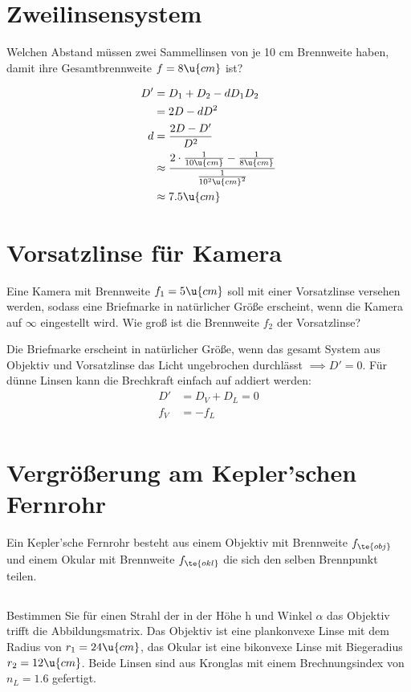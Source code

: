 \documentclass[ex]{exercise}
\begin{document}
\section{Zweilinsensystem}
Welchen Abstand müssen zwei Sammellinsen von je 10 cm Brennweite haben, damit ihre 
Gesamtbrennweite \(f=8 \u{cm}\) ist?

\dottedline

\begin{align*}
    D' &= D_1 + D_2 - d D_1 D_2\\
    &= 2 D - d D^2\\
    d &=\frac{2D - D'}{D^2}\\
    &\approx \frac{2\cdot \frac 1{10\u{cm}} - \frac1{8\u{cm}}}{\frac1{10^2\u{cm}^2}}\\
    &\approx 7.5\u{cm}
\end{align*}

\section{Vorsatzlinse für Kamera}
Eine Kamera mit Brennweite $f_1 = 5 \u{cm}$ soll mit einer Vorsatzlinse versehen werden, sodass eine 
Briefmarke in natürlicher Größe erscheint, wenn die Kamera auf \(\infty\) eingestellt wird.
Wie groß ist die Brennweite $f_2$ der Vorsatzlinse?

\dottedline\vspace{-0.2cm}

Die Briefmarke erscheint in natürlicher Größe, wenn das gesamt System aus Objektiv und Vorsatzlinse
das Licht ungebrochen durchlässt \(\implies D' = 0\).
Für dünne Linsen kann die Brechkraft einfach auf addiert werden:
\begin{align*}
    D' &= D_V + D_L=0\\
    f_V &= - f_L\\
\end{align*}

\section{Vergrö{\ss}erung am Kepler'schen Fernrohr}
Ein Kepler’sche Fernrohr besteht aus einem Objektiv mit Brennweite $f_{\te{obj}}$ 
und einem Okular mit Brennweite $f_{\te{okl}}$ die sich den selben Brennpunkt teilen.

\subsection{}
Bestimmen Sie für einen Strahl der in der Höhe h und Winkel \(\alpha\) das Objektiv trifft die 
Abbildungsmatrix. Das Objektiv ist eine plankonvexe Linse mit dem Radius von $r_1 = 24 \u{cm}$, 
das Okular ist eine bikonvexe Linse mit Biegeradius $r_2 = 12 \u{cm}$. 
Beide Linsen sind aus Kronglas mit einem Brechnungsindex von $n_L = 1.6$ gefertigt.
\end{document}
